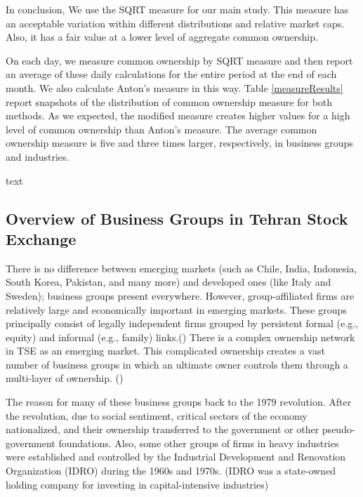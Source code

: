 \documentclass[12pt, a4paper]{article}
\begin{document}
In conclusion, We use the SQRT measure for our main study. This measure has an acceptable variation within different distributions and relative market caps. Also, it has a fair value at a lower level of aggregate common ownership. 

On each day, we measure common ownership by SQRT measure and then report an average of these daily calculations for the entire period at the end of each month. We also calculate Anton's measure in this way. Table \ref{measureResults} report snapshots of the distribution of
common ownership measure for both methods. As we expected, the modified measure creates higher values for a high level of common ownership than Anton's measure. The average common ownership measure is five and three times larger, respectively, in business groups and industries.


\begin{table}[htbp]
	\centering
	\caption{ text}
	\label{measureResults}
	\resizebox{1\textwidth}{!}
	{
		
	}
\end{table}%





\FloatBarrier



\subsection{Overview of Business Groups in Tehran Stock Exchange} \label{BGDef}

There is no difference between emerging markets (such as  Chile, India, Indonesia, South Korea, Pakistan, and many more) and developed ones (like Italy and Sweden); business groups present everywhere. However, group-affiliated firms are relatively large and economically important in emerging markets. 
These groups principally consist of legally independent firms grouped by persistent formal (e.g., equity) and informal (e.g., family) links.(\cite{Khanna2007}) 
There is a complex ownership network in TSE as an emerging market. 
This complicated ownership creates a vast number of business groups in which an ultimate owner controls them through a multi-layer of ownership. (\cite{FirmInterlock})

The reason for many of these business groups back to the 1979 revolution. After the revolution, due to social sentiment, critical sectors of the economy nationalized, and their ownership transferred to the government or other pseudo-government foundations. Also,
some other groups of firms in heavy industries were established and controlled by the Industrial Development and Renovation Organization (IDRO) during the 1960s and 1970s.  (IDRO was a state-owned holding company for investing in capital-intensive industries) 
\end{document}
